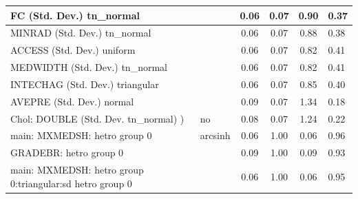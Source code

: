 \begin{table}
\begin{center}
\begin{tabular}{|l|l|c|c|c|l|}
			\hline
			FC (Std. Dev.) tn_normal &  & 0.06 & 0.07 & 0.90 & 0.37 \\
			\hline
			MINRAD (Std. Dev.) tn_normal &  & 0.06 & 0.07 & 0.88 & 0.38 \\
			\hline
			ACCESS (Std. Dev.) uniform &  & 0.06 & 0.07 & 0.82 & 0.41 \\
			\hline
			MEDWIDTH (Std. Dev.) tn_normal &  & 0.06 & 0.07 & 0.82 & 0.41 \\
			\hline
			INTECHAG (Std. Dev.) triangular &  & 0.06 & 0.07 & 0.85 & 0.40 \\
			\hline
			AVEPRE (Std. Dev.) normal &  & 0.09 & 0.07 & 1.34 & 0.18 \\
			\hline
			 Chol: DOUBLE (Std. Dev. tn_normal) ) & no & 0.08 & 0.07 & 1.24 & 0.22 \\
			\hline
			main: MXMEDSH: hetro group 0 & arcsinh & 0.06 & 1.00 & 0.06 & 0.96 \\
			\hline
			GRADEBR: hetro group 0 &  & 0.09 & 1.00 & 0.09 & 0.93 \\
			\hline
			main: MXMEDSH: hetro group 0:triangular:sd  hetro group 0 &  & 0.06 & 1.00 & 0.06 & 0.95 \\
			\hline
		\end{tabular}
	\end{center}
\end{table}